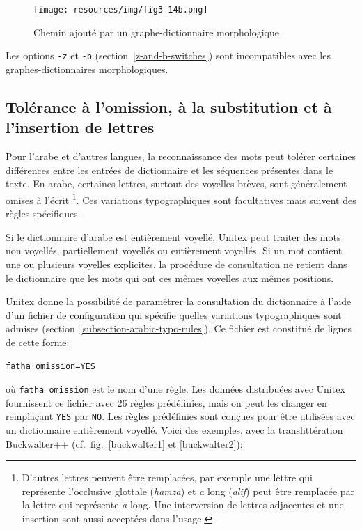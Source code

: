 \begin{figure}[!ht]
\begin{center}
\texttt{[image: resources/img/fig3-14b.png]}
\caption{Chemin ajouté par un graphe-dictionnaire morphologique\label{morphoB}}
\end{center}
\end{figure}

\bigskip
\noindent Les options \verb+-z+ et \verb+-b+ (section~\ref{z-and-b-switches}) sont
incompatibles avec les graphes-dic\-tion\-naires morphologiques.

\subsection{Tolérance à l'omission, à la substitution et à l'insertion de lettres}
\label{section-vowel-restoration}
Pour l'arabe et d'autres langues, la reconnaissance des mots peut tolérer certaines différences entre les entrées de dictionnaire et les séquences présentes dans le texte. En arabe, certaines lettres, surtout des voyelles brèves, sont généralement omises à l'écrit
\footnote{ D'autres lettres peuvent être remplacées, par exemple une lettre qui représente l'occlusive glottale (\textit{hamza}) et \textit{a} long (\textit{alif}) peut être remplacée par la lettre qui représente \textit{a} long. Une interversion de lettres adjacentes et une insertion sont aussi acceptées dans l'usage.}. Ces variations typographiques sont facultatives mais suivent des règles spécifiques.

\bigskip
\noindent Si le dictionnaire d'arabe est entièrement voyellé, Unitex peut traiter des mots non voyellés, partiellement voyellés ou entièrement voyellés. Si un mot contient une ou plusieurs voyelles explicites, la procédure de consultation ne retient dans le dictionnaire que les mots qui ont ces mêmes voyelles aux mêmes positions.

\bigskip
\noindent Unitex donne la possibilité de paramétrer la consultation du dictionnaire à l'aide d'un fichier de configuration qui spécifie quelles variations typographiques sont admises (section~\ref{subsection-arabic-typo-rules}). Ce fichier est constitué de lignes de cette forme:

\bigskip
\verb$fatha omission=YES$

\bigskip
\noindent où \verb$fatha omission$ est le nom d'une règle. Les données distribuées avec Unitex fournissent ce fichier avec 26 règles prédéfinies, mais on peut les changer en remplaçant \verb$YES$ par \verb$NO$. Les règles prédéfinies sont conçues pour être utilisées avec un dictionnaire entièrement voyellé. Voici des exemples, avec la translittération Buckwalter++ (cf.~fig.~\ref{buckwalter1} et \ref{buckwalter2}):


